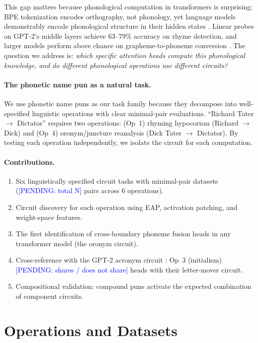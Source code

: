 \documentclass[11pt,a4paper]{article}
\newcommand{\PENDING}[1]{\textcolor{blue}{[PENDING: #1]}}
\begin{document}
This gap matters because phonological computation in transformers is
surprising: BPE tokenization encodes orthography, not phonology, yet language
models demonstrably encode phonological structure in their hidden states
\citep{liao2026tokenization}. Linear probes on GPT-2's middle layers achieve
63--79\% accuracy on rhyme detection, and larger models perform above chance
on grapheme-to-phoneme conversion \citep{suvarna2024phonologybench}. The
question we address is: \emph{which specific attention heads compute this
phonological knowledge, and do different phonological operations use different
circuits?}

\paragraph{The phonetic name pun as a natural task.}
We use phonetic name puns as our task family because they decompose into
well-specified linguistic operations with clear minimal-pair evaluations.
``Richard Tater $\to$ Dictator'' requires two operations: (Op~1) rhyming
hypocorism (Richard $\to$ Dick) and (Op~4) oronym/juncture reanalysis
(Dick Tater $\to$ Dictator). By testing each operation independently, we
isolate the circuit for each computation.

\paragraph{Contributions.}
\begin{enumerate}[leftmargin=*,itemsep=2pt]
  \item Six linguistically specified circuit tasks with minimal-pair datasets
  (\PENDING{total N} pairs across 6 operations).
  \item Circuit discovery for each operation using EAP, activation patching,
  and weight-space features.
  \item The first identification of cross-boundary phoneme fusion heads in
  any transformer model (the oronym circuit).
  \item Cross-reference with the GPT-2 acronym circuit
  \citep{garcia2024acronym}: Op~3 (initialism) \PENDING{shares / does not
  share} heads with their letter-mover circuit.
  \item Compositional validation: compound puns activate the expected
  combination of component circuits.
\end{enumerate}

\section{Operations and Datasets}
\end{document}
